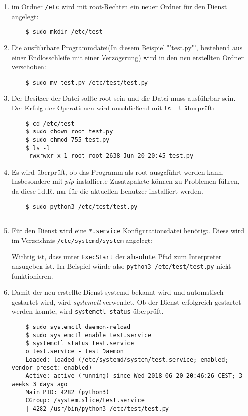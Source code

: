 \begin{enumerate}
	\item im Ordner \texttt{/etc} wird mit root-Rechten ein neuer Ordner für den Dienst angelegt:
	\begin{lstlisting}
	$ sudo mkdir /etc/test
	\end{lstlisting}
	
	\item Die ausführbare Programmdatei(In diesem Beispiel "'test.py"', bestehend aus einer Endlosschleife mit einer Verzögerung) wird in den neu erstellten Ordner verschoben:
	\begin{lstlisting}
	$ sudo mv test.py /etc/test/test.py
	\end{lstlisting}
	
	\item Der Besitzer der Datei sollte root sein und die Datei muss ausführbar sein. Der Erfolg der Operationen wird anschließend mit \texttt{ls -l} überprüft:
	\begin{lstlisting}
	$ cd /etc/test
	$ sudo chown root test.py
	$ sudo chmod 755 test.py
	$ ls -l
	-rwxrwxr-x 1 root root 2638 Jun 20 20:45 test.py
	\end{lstlisting}
	
	\item Es wird überprüft, ob das Programm als root ausgeführt werden kann. Insbesondere mit \textit{pip} installierte Zusatzpakete können zu Problemen führen, da diese i.d.R. nur für die aktuellen Benutzer installiert werden.
	\begin{lstlisting}
	$ sudo python3 /etc/test/test.py
	
	\end{lstlisting}
	
	\item Für den Dienst wird eine \texttt{*.service} Konfigurationsdatei benötigt. Diese wird im Verzeichnis \texttt{/etc/systemd/system} angelegt:
	
	
	
	Wichtig ist, dass unter \texttt{ExecStart} der \textbf{absolute} Pfad zum Interpreter anzugeben ist. Im Beispiel würde also \texttt{python3 /etc/test/test.py} nicht funktionieren.
	
	\item Damit der neu erstellte Dienst systemd bekannt wird und automatisch gestartet wird, wird \textit{systemctl} verwendet. Ob der Dienst erfolgreich gestartet werden konnte, wird \texttt{systemctl status} überprüft.
	\begin{lstlisting}
	$ sudo systemctl daemon-reload
	$ sudo systemctl enable test.service
	$ systemctl status test.service
	o test.service - test Daemon
	Loaded: loaded (/etc/systemd/system/test.service; enabled; vendor preset: enabled)
	Active: active (running) since Wed 2018-06-20 20:46:26 CEST; 3 weeks 3 days ago
	Main PID: 4282 (python3)
	CGroup: /system.slice/test.service
	|-4282 /usr/bin/python3 /etc/test/test.py
	

\end{lstlisting}
\end{enumerate}
